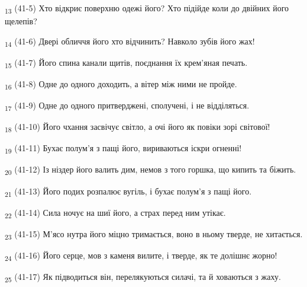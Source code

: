 \begin{tcolorbox}
\textsubscript{13} (41-5) Хто відкриє поверхню одежі його? Хто підійде коли до двійних його щелепів?
\end{tcolorbox}
\begin{tcolorbox}
\textsubscript{14} (41-6) Двері обличчя його хто відчинить? Навколо зубів його жах!
\end{tcolorbox}
\begin{tcolorbox}
\textsubscript{15} (41-7) Його спина канали щитів, поєднання їх крем'яная печать.
\end{tcolorbox}
\begin{tcolorbox}
\textsubscript{16} (41-8) Одне до одного доходить, а вітер між ними не пройде.
\end{tcolorbox}
\begin{tcolorbox}
\textsubscript{17} (41-9) Одне до одного притверджені, сполучені, і не відділяться.
\end{tcolorbox}
\begin{tcolorbox}
\textsubscript{18} (41-10) Його чхання засвічує світло, а очі його як повіки зорі світової!
\end{tcolorbox}
\begin{tcolorbox}
\textsubscript{19} (41-11) Бухає полум'я з пащі його, вириваються іскри огненні!
\end{tcolorbox}
\begin{tcolorbox}
\textsubscript{20} (41-12) Із ніздер його валить дим, немов з того горшка, що кипить та біжить.
\end{tcolorbox}
\begin{tcolorbox}
\textsubscript{21} (41-13) Його подих розпалює вугіль, і бухає полум'я з пащі його.
\end{tcolorbox}
\begin{tcolorbox}
\textsubscript{22} (41-14) Сила ночує на шиї його, а страх перед ним утікає.
\end{tcolorbox}
\begin{tcolorbox}
\textsubscript{23} (41-15) М'ясо нутра його міцно тримається, воно в ньому тверде, не хитається.
\end{tcolorbox}
\begin{tcolorbox}
\textsubscript{24} (41-16) Його серце, мов з каменя вилите, і тверде, як те долішнє жорно!
\end{tcolorbox}
\begin{tcolorbox}
\textsubscript{25} (41-17) Як підводиться він, перелякуються силачі, та й ховаються з жаху.
\end{tcolorbox}
